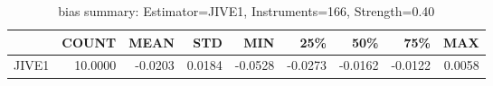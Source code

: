 \begin{table}[ht]
\centering
\caption{bias summary: Estimator=JIVE1, Instruments=166, Strength=0.40}
\begin{tabular}{lrrrrrrrr}
\toprule
 & COUNT & MEAN & STD & MIN & 25\% & 50\% & 75\% & MAX \\
\midrule
JIVE1 & 10.0000 & -0.0203 & 0.0184 & -0.0528 & -0.0273 & -0.0162 & -0.0122 & 0.0058 \\
\bottomrule
\end{tabular}
\end{table}
